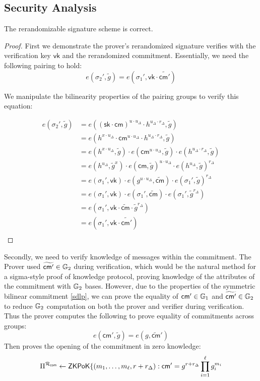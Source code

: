 \subsection{Security Analysis}

\begin{theorem}
The rerandomizable signature scheme is correct.
\end{theorem}


\begin{proof}
First we demonstrate the prover's rerandomized signature verifies with the verification key $\mathsf{vk}$ and the rerandomized commitment. Essentially, we need the following pairing to hold:
\[
    e(\sigma_2', \tilde{g}) = e(\sigma_1', \mathsf{vk} \cdot \widetilde{\mathsf{cm}'})
\]

We manipulate the bilinearity properties of the pairing groups to verify this equation:
    
\begin{align*}
    e(\sigma_2', \tilde{g}) &= e((\mathsf{sk} \cdot \mathsf{cm})^{u \cdot u_\Delta} \cdot h^{u_\Delta \cdot r_\Delta}, \tilde{g}) \\
    &= e(h^{x \cdot u_\Delta} \cdot \mathsf{cm}^{u \cdot u_\Delta} \cdot h^{u_\Delta \cdot r_\Delta}, \tilde{g}) \\
    &= e(h^{x \cdot u_\Delta}, \tilde{g}) \cdot e(\mathsf{cm}^{u \cdot u_\Delta}, \tilde{g}) \cdot e(h^{u_\Delta \cdot r_\Delta}, \tilde{g}) \\
    &= e(h^{u_\Delta}, \tilde{g}^x) \cdot e(\mathsf{cm}, \tilde{g})^{u \cdot u_\Delta} \cdot e(h^{u_\Delta}, \tilde{g})^{r_\Delta} \\
    &= e(\sigma_1', \mathsf{vk}) \cdot e(g^{u \cdot u_\Delta}, \widetilde{\mathsf{cm}}) \cdot e(\sigma_1', \tilde{g})^{r_\Delta} \\
    &= e(\sigma_1', \mathsf{vk}) \cdot e(\sigma_1', \widetilde{\mathsf{cm}}) \cdot e(\sigma_1', \tilde{g}^{r_\Delta}) \\
    &= e(\sigma_1', \mathsf{vk} \cdot \widetilde{\mathsf{cm}} \cdot \tilde{g}^{r_\Delta}) \\
    &= e(\sigma_1', \mathsf{vk} \cdot \widetilde{\mathsf{cm}'}) \\
\end{align*}
\end{proof}

Secondly, we need to verify knowledge of messages within the commitment. The Prover used $\widetilde{\mathsf{cm}'} \in \mathbb{G}_2$ during verification, which would be the natural method for a sigma-style proof of knowledge protocol, proving knowledge of the attributes of the commitment with $\mathbb{G}_2$ bases. However, due to the properties of the symmetric bilinear commitment \ref{sdlp}, we can prove the equality of $\mathsf{cm}' \in \mathbb{G}_1$ and $\widetilde{\mathsf{cm}'} \in \mathbb{G}_2$ to reduce $\mathbb{G}_2$ computation on both the prover and verifier during verification. 
Thus the prover computes the following to prove equality of commitments across groups:
\[
    e(\mathsf{cm}', \tilde{g}) = e(g, \widetilde{\mathsf{cm}}')
\]
Then proves the opening of the commitment in zero knowledge:
\[
 \Pi^{\mathcal{R}_{\mathsf{com}}}  \gets \mathsf{ZKPoK}\{(m_1,\ldots,m_\ell, r + r_\Delta): \mathsf{cm}' = g^{r + r_\Delta} \prod_{i=1}^\ell g_i^{m_i}
\]



